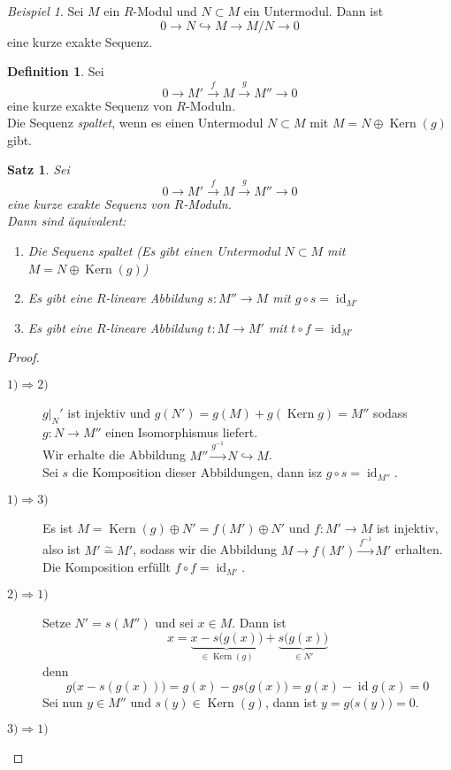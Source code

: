\documentclass[10pt,a4paper]{article}
\newcommand{\id}{\operatorname{id}}
\newcommand{\isom}{\overset{\sim}{=}}
\newcommand{\Kern}{\operatorname{Kern}}
\theoremstyle{plain}
\newtheorem{satz}[theorem]{Satz}
\theoremstyle{definition}
\newtheorem{definition}[theorem]{Definition}
\theoremstyle{remark}
\newtheorem{exm}[theorem]{Beispiel}
\begin{document}
	\begin{exm}
		Sei $M$ ein $R$-Modul und $N\subset M$ ein Untermodul. Dann ist
		\[0\to N\hookrightarrow M\to M/N\to 0\]
		eine kurze exakte Sequenz.
	\end{exm}
	
	\begin{definition}
			Sei
		\[0\to M'\xrightarrow{f}M\xrightarrow{g}M''\to 0\]
		eine kurze exakte Sequenz von $R$-Moduln.\\
		Die Sequenz \emph{spaltet}, wenn es einen Untermodul $N\subset M$ mit $M=N\oplus\Kern(g)$ gibt.
	\end{definition}
	
	\begin{satz}
		Sei
		\[0\to M'\xrightarrow{f}M\xrightarrow{g}M''\to 0\]
		eine kurze exakte Sequenz von $R$-Moduln.\\
		Dann sind äquivalent:
		\begin{enumerate}
			\item Die Sequenz spaltet (Es gibt einen Untermodul $N\subset M$ mit $M=N\oplus\Kern(g)$)
			\item Es gibt eine $R$-lineare Abbildung $s:M''\to M$ mit $g\circ s=\id_{M'}$
			\item Es gibt eine $R$-lineare Abbildung $t:M\to M'$ mit $t\circ f=\id_{M'}$
		\end{enumerate}
	\end{satz}
	\begin{proof}
		\begin{description}
			\item[$1)\Rightarrow2)$] $g|_N'$ ist injektiv und
			$g(N')=g(M)+g(\Kern g)=M''$ %
			sodass $g:N\to M''$ einen Isomorphismus liefert.\\
			Wir erhalte die Abbildung $M''\xrightarrow{g^{-1}}N\hookrightarrow M$.\\
			Sei $s$ die Komposition dieser Abbildungen, dann isz $g\circ s=\id_{M''}$.
			\item[$1)\Rightarrow3)$] Es ist $M=\Kern(g)\oplus N'=f(M')\oplus N'$ und $f:M'\to M$ ist injektiv, also ist $M'\isom M'$, sodass wir die Abbildung $M\to f(M')\xrightarrow{f^{-1}} M'$ erhalten.\\
			Die Komposition erfüllt $f\circ f=\id_{M'}$.
			\item[$2)\Rightarrow1)$] Setze $N'=s(M'')$ und sei $x\in M$. Dann ist
			\[x=\underbrace{x-s\big(g(x)\big)}_{\in\Kern(g)}+\underbrace{s\big(g(x)\big)}_{\in N'}\]
			denn
			\[g\big(x-s(g(x))\big)=g(x)-gs\big(g(x)\big)=g(x)-\id g(x)=0\]
			Sei nun $y\in M''$ und $s(y)\in \Kern(g)$, dann ist $y=g\big(s(y)\big)=0$.
			\item[$3)\Rightarrow1)$]
		\end{description}
	\end{proof}
\end{document}
